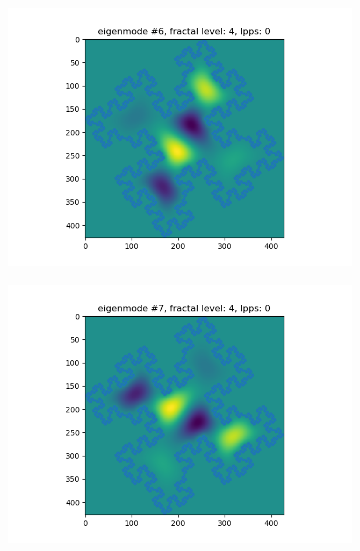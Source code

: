 \documentclass{article}
\begin{document}
\begin{figure}
\begin{subfigure}{0.3\textwidth}
    \end{subfigure}
    \begin{subfigure}{0.3\textwidth}
        \includegraphics[width=\linewidth]{../figs/eigenmode_2d6.png}
    \end{subfigure}
    \begin{subfigure}{0.3\textwidth}
        \includegraphics[width=\linewidth]{../figs/eigenmode_2d7.png}
    \end{subfigure}
    \begin{subfigure}{0.3\textwidth}

\end{subfigure}
\end{figure}
\end{document}
